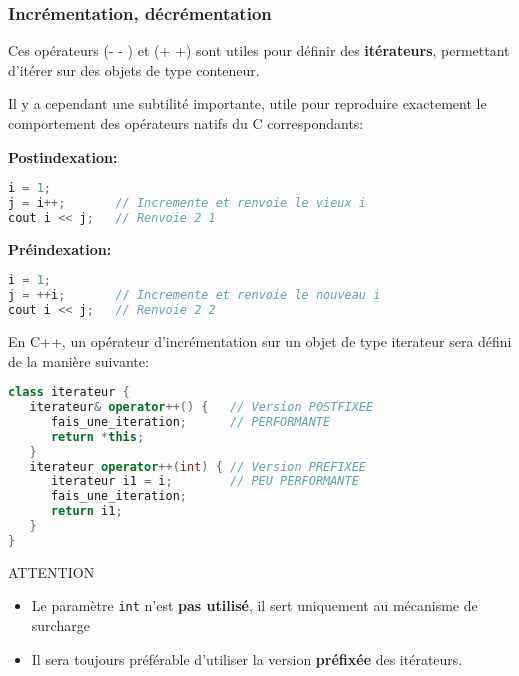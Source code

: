 \documentclass{beamer}
\begin{document}
\begin{frame}[fragile=singleslide,shrink=20]
\frametitle {Incrémentation, décrémentation}

Ces opérateurs (- - ) et (+ +) sont utiles pour définir des \textbf{itérateurs}, permettant d'itérer sur des objets de type conteneur.

Il y a cependant une subtilité importante, utile pour reproduire exactement le comportement des opérateurs natifs du C correspondants:

\textbf{Postindexation:}
\begin{lstlisting}[language=c++]
i = 1;
j = i++;       // Incremente et renvoie le vieux i
cout i << j;   // Renvoie 2 1
\end{lstlisting}

\textbf{Préindexation:}
\begin{lstlisting}[language=c++]
i = 1;
j = ++i;       // Incremente et renvoie le nouveau i
cout i << j;   // Renvoie 2 2
\end{lstlisting}

En C++, un opérateur d'incrémentation sur un objet de type iterateur sera défini de la manière suivante:
\begin{lstlisting}[language=c++]
class iterateur {
   iterateur& operator++() {   // Version POSTFIXEE
      fais_une_iteration;      // PERFORMANTE
      return *this;
   }
   iterateur operator++(int) { // Version PREFIXEE
      iterateur i1 = i;        // PEU PERFORMANTE
      fais_une_iteration;
      return i1;
   }
}
\end{lstlisting}
\begin{block}{ATTENTION}
\begin{itemize}
   \item{Le paramètre \texttt{int} n'est \textbf{pas utilisé}, il sert uniquement au mécanisme de surcharge}
   \item{Il sera toujours préférable d'utiliser la version \textbf{préfixée} des itérateurs.}
\end{itemize}
\end{block}
\end{frame}
\end{document}

